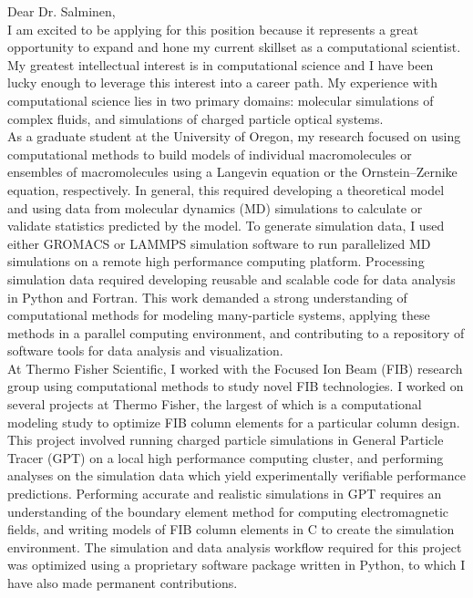 \documentclass[]{letter}
\begin{document}

Dear Dr. Salminen, \\

I am excited to be applying for this position because it represents a great opportunity to expand and hone my current skillset as a computational scientist. My greatest intellectual interest is in computational science and I have been lucky enough to leverage this interest into a career path. My experience with computational science lies in two primary domains: molecular simulations of complex fluids, and simulations of charged particle optical systems. \\

As a graduate student at the University of Oregon, my research focused on using computational methods to build models of individual macromolecules or ensembles of macromolecules using a Langevin equation or the Ornstein–Zernike equation, respectively. In general, this required developing a theoretical model and using data from molecular dynamics (MD) simulations to calculate or validate statistics predicted by the model. To generate simulation data, I used either GROMACS or LAMMPS simulation software to run parallelized MD simulations on a remote high performance computing platform. Processing simulation data required developing reusable and scalable code for data analysis in Python and Fortran. This work demanded a strong understanding of computational methods for modeling many-particle systems, applying these methods in a parallel computing environment, and contributing to a repository of software tools for data analysis and visualization. \\

At Thermo Fisher Scientific, I worked with the Focused Ion Beam (FIB) research group using computational methods to study novel FIB technologies. I worked on several projects at Thermo Fisher, the largest of which is a computational modeling study to optimize FIB column elements for a particular column design. This project involved running charged particle simulations in General Particle Tracer (GPT) on a local high performance computing cluster, and performing analyses on the simulation data which yield experimentally verifiable performance predictions. Performing accurate and realistic simulations in GPT requires an understanding of the boundary element method for computing electromagnetic fields, and writing models of FIB column elements in C to create the simulation environment. The simulation and data analysis workflow required for this project was optimized using a proprietary software package written in Python, to which I have also made permanent contributions. \\
\end{document}
